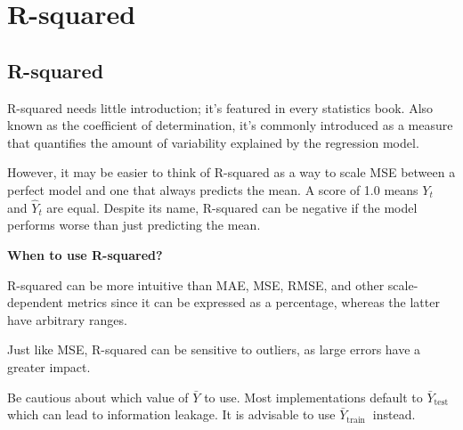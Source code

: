 \section{R-squared}
\subsection{R-squared}
\thispagestyle{regressionstyle}

R-squared needs little introduction; it's featured in every statistics book. Also known as the coefficient of determination, it's commonly introduced as a measure that quantifies the amount of variability explained by the regression model.

\begin{center}
\end{center}

However, it may be easier to think of R-squared as a way to scale MSE between a perfect model and one that always predicts the mean. A score of 1.0 means $Y_t$ and $\hat{Y}_t$ are equal. Despite its name, R-squared can be negative if the model performs worse than just predicting the mean.

\textbf{When to use R-squared?}

R-squared can be more intuitive than MAE, MSE, RMSE, and other scale-dependent metrics since it can be expressed as a percentage, whereas the latter have arbitrary ranges.

{
    \item Just like MSE, R-squared can be sensitive to outliers, as large errors have a greater impact.
    \item Be cautious about which value of $\bar{Y}$ to use. Most implementations default to $\bar{Y}_{\text {test }}$ which can lead to information leakage. It is advisable to use $\bar{Y}_{\text {train }}$ instead.
}


